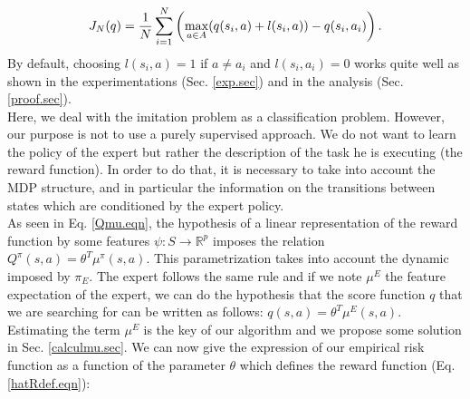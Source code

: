 \documentclass{article}
\begin{document}
\begin{equation}
\label{Jdef.eqn}
J_N(q) = {1\over N} \sum_{i=1}^N\left(\max_{a\in A}(q(s_i,a) + l(s_i,a)) - q(s_i,a_i) \right).
\end{equation}
%
%
By default, choosing $l(s_i,a) = 1$ if $a\neq a_i$ and $l(s_i,a_i)=0$ works quite well as shown in the experimentations (Sec. \ref{exp.sec}) and in the analysis (Sec. \ref{proof.sec}).\\
Here, we deal with the imitation problem as a classification problem. However, our purpose is not to use a purely supervised approach. We do not want to learn the policy of the expert but rather the description of the task he is executing (the reward function). In order to do that, it is necessary to take into account the MDP structure, and in particular the information on the transitions between states which are conditioned by the expert policy.\\
As seen in Eq. \eqref{Qmu.eqn}, the hypothesis of a linear representation of the reward function by some features $\psi: S\rightarrow \mathbb{R}^p$ imposes the relation $Q^\pi(s,a) = \theta^T\mu^\pi(s,a)$. This parametrization takes into account the dynamic imposed by $\pi_E$. The expert follows the same rule and if we note $\mu^E$ the feature expectation of the expert, we can do the hypothesis that the score function $q$ that we are searching for can be written as follows: $q(s,a) = \theta^T\mu^E(s,a)$. Estimating the term $\mu^E$ is the key of our algorithm and we propose some solution in Sec. \ref{calculmu.sec}. We can now give the expression of our empirical risk function as a function of the parameter $\theta$ which defines the reward function (Eq. \eqref{hatRdef.eqn}):
\end{document}
